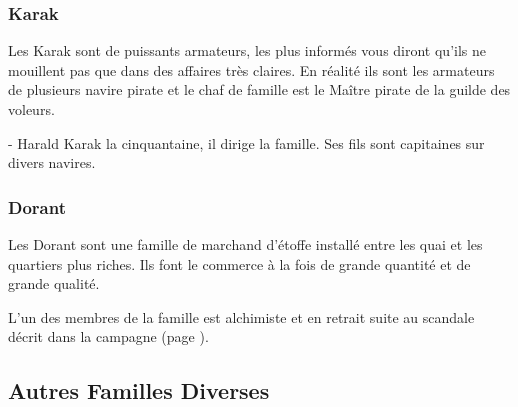 \subsubsection*{Karak}

Les Karak sont de puissants armateurs, les plus informés vous diront qu'ils
ne mouillent pas que dans des affaires très claires. En réalité ils sont les
armateurs de plusieurs navire pirate et le chaf de famille est le Maître pirate
de la guilde des voleurs.

- Harald Karak la cinquantaine, il dirige la famille. Ses fils sont capitaines 
sur divers navires. 

\subsubsection*{Dorant}

Les Dorant sont une famille de marchand d'étoffe installé entre les quai et
les quartiers plus riches. Ils font le commerce à la fois de grande 
quantité et de grande qualité. 

L'un des membres de la famille est alchimiste et en retrait suite au 
scandale décrit dans la campagne (page \pageref{TAS-Magie}).

\subsection*{Autres Familles Diverses}

